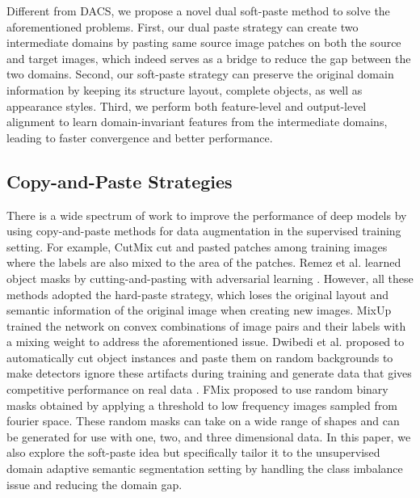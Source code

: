 \documentclass[sigconf]{acmart}
\begin{document}
Different from DACS, we propose a novel dual soft-paste method to solve the aforementioned problems. First, our dual paste strategy can create two intermediate domains by pasting same source image patches on both the source and target images, which indeed serves as a bridge to reduce the gap between the two domains. Second, our soft-paste strategy can preserve the original domain information by keeping its structure layout, complete objects, as well as appearance styles. Third, we perform both feature-level and output-level alignment to learn domain-invariant features from the intermediate domains, leading to faster convergence and better performance. 


\subsection{Copy-and-Paste Strategies}
There is a wide spectrum of work to improve the performance of deep models by using copy-and-paste methods for data augmentation in the supervised training setting. For example, CutMix \cite{cutmix} cut and pasted patches among training images where the labels are also mixed to the area of the patches. Remez et al. learned object masks by cutting-and-pasting with adversarial learning \cite{lscp}. However, all these methods adopted the hard-paste strategy, which loses the original layout and semantic information of the original image when creating new images. MixUp \cite{mixup} trained the network on convex combinations of image pairs and their labels with a mixing weight to address the aforementioned issue. Dwibedi et al. proposed to automatically cut object instances and paste them on random backgrounds to make detectors ignore these artifacts during training and generate data that gives competitive performance on real data \cite{cpl}. FMix \cite{fmix} proposed to use random binary masks obtained by applying a threshold to low frequency images sampled from fourier space. These random masks can take on a wide range of shapes and can be generated for use with one, two, and three dimensional data. In this paper, we also explore the soft-paste idea but specifically tailor it to the unsupervised domain adaptive semantic segmentation setting by handling the class imbalance issue and reducing the domain gap. 
\end{document}
